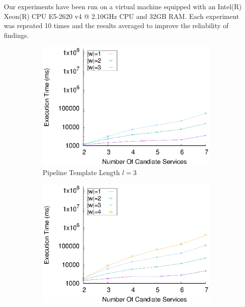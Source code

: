     Our experiments have been run on a virtual machine equipped with an Intel(R) Xeon(R) CPU E5-2620 v4 @ 2.10GHz CPU and 32GB RAM. Each experiment was repeated 10 times and the results averaged to improve the reliability of findings.

    \begin{figure}[!ht]
      \centering
      \begin{subfigure}{0.45\textwidth}
        \includegraphics[width=\textwidth]{Images/graphs/window_time_performance_qualitative_n7_s7_50_80_n3}
        \caption{Pipeline Template Length $l$$=$3}
        \label{fig:time_window_perce_wide_3n}
      \end{subfigure}
      \hfill
      \begin{subfigure}{0.45\textwidth}
        \includegraphics[width=\textwidth]{Images/graphs/window_time_performance_qualitative_n7_s7_50_80_n4}

\end{subfigure}
\end{figure}

